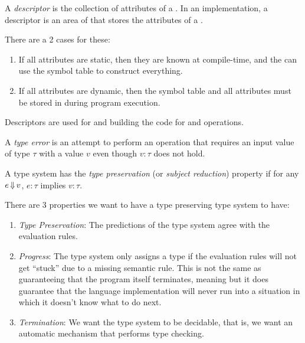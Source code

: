 \begin{definition}[Descriptor]\label{def:Descriptor}
  A \emph{descriptor} is the collection of attributes of a .
  In an implementation, a descriptor is an area of  that stores the attributes of a .
  
  There are a 2 cases for these:
  \begin{enumerate}[noitemsep]
  \item If all attributes are static, then they are known at compile-time, and the  can use the symbol table to construct everything.
  \item If all attributes are dynamic, then the symbol table and all attributes must be stored in  during program execution.
  \end{enumerate}

  Descriptors are used for  and building the code for  and  operations.
\end{definition}

\begin{definition}\label{def:Type_Error}
  A \emph{type error} is an attempt to perform an operation that requires an input value of type $\tau$ with a value $v$ even though $v : \tau$ does not hold.
\end{definition}

\begin{definition}\label{def:Type_Preservation}
  A type system has the \emph{type preservation} (or \emph{subject reduction}) property if for any $e \operatorname{\Downarrow} v$, $e : \tau$ implies $v : \tau$.

  There are 3 properties we want to have a type preserving type system to have:
  \begin{enumerate}[noitemsep]
  \item \emph{Type Preservation}: The predictions of the type system agree with the evaluation rules.
  \item \emph{Progress}: The type system only assigns a type if the evaluation rules will not get ``stuck'' due to a missing semantic rule. This is not the same as guaranteeing that the program itself terminates, meaning but it does guarantee that the language implementation will never run into a situation in which it doesn't know what to do next.
  \item \emph{Termination}: We want the type system to be decidable, that is, we want an automatic mechanism that performs type checking.
  \end{enumerate}
\end{definition}

